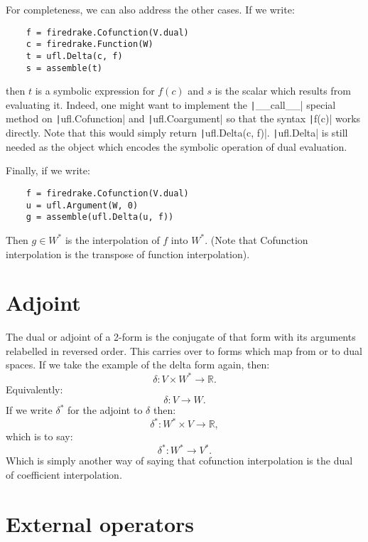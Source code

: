 \documentclass[a4paper,11pt]{article}
\begin{document}
For completeness, we can also address the other cases. If we write:
\begin{verbatim}
    f = firedrake.Cofunction(V.dual)
    c = firedrake.Function(W)
    t = ufl.Delta(c, f)
    s = assemble(t)
\end{verbatim}
then $t$ is a symbolic expression for $f(c)$ and $s$ is the scalar which results from evaluating it. Indeed, one might want to implement the \texttt|__call__| special method on \texttt|ufl.Cofunction| and \texttt|ufl.Coargument| so that the syntax \texttt|f(c)| works directly. Note that this would simply return \texttt|ufl.Delta(c, f)|. \texttt|ufl.Delta| is still needed as the object which encodes the symbolic operation of dual evaluation.

Finally, if we write:
\begin{verbatim}
    f = firedrake.Cofunction(V.dual)
    u = ufl.Argument(W, 0)
    g = assemble(ufl.Delta(u, f))
\end{verbatim} 
Then $g\in W^*$ is the interpolation of $f$ into $W^*$. (Note that Cofunction interpolation is the transpose of function interpolation).

\section{Adjoint}

The  dual or adjoint of a 2-form is the conjugate of that form with its arguments relabelled in reversed order. This carries over to forms which map from or to dual spaces. If we take the example of the delta form again, then:
\begin{equation}
    \delta: V \times W^* \rightarrow \mathbb{R}.
\end{equation}
Equivalently:
\begin{equation}
    \delta: V \rightarrow W.
\end{equation}
If we write $\delta^*$ for the adjoint to $\delta$ then:
\begin{equation}
    \delta^*: W^* \times V \rightarrow \mathbb{R},
\end{equation}
which is to say:
\begin{equation}
    \delta^*: W^* \rightarrow V^*.
\end{equation}
Which is simply another way of saying that cofunction interpolation is the dual of coefficient interpolation.

\section{External operators}
\end{document}
